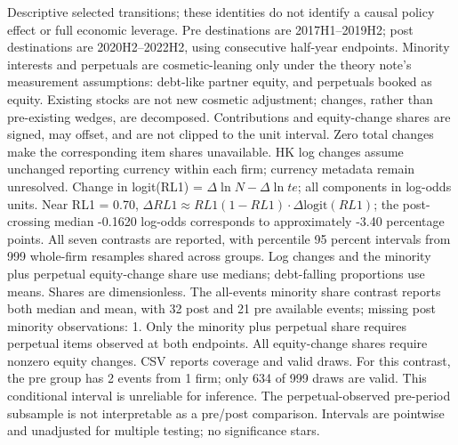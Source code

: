 \begin{table}[!htbp]
\begin{threeparttable}
\begin{tablenotes}[flushleft]
\item[] Descriptive selected transitions; these identities do not identify a causal policy effect or full economic leverage. Pre destinations are 2017H1--2019H2; post destinations are 2020H2--2022H2, using consecutive half-year endpoints. Minority interests and perpetuals are cosmetic-leaning only under the theory note's measurement assumptions: debt-like partner equity, and perpetuals booked as equity. Existing stocks are not new cosmetic adjustment; changes, rather than pre-existing wedges, are decomposed. Contributions and equity-change shares are signed, may offset, and are not clipped to the unit interval. Zero total changes make the corresponding item shares unavailable. HK log changes assume unchanged reporting currency within each firm; currency metadata remain unresolved. Change in logit(RL1) = $\Delta\ln N - \Delta\ln te$; all components in log-odds units. Near RL1 = 0.70, $\Delta RL1 \approx RL1(1-RL1)\cdot\Delta\mathrm{logit}(RL1)$; the post-crossing median -0.1620 log-odds corresponds to approximately -3.40 percentage points. All seven contrasts are reported, with percentile 95 percent intervals from 999 whole-firm resamples shared across groups. Log changes and the minority plus perpetual equity-change share use medians; debt-falling proportions use means. Shares are dimensionless. The all-events minority share contrast reports both median and mean, with 32 post and 21 pre available events; missing post minority observations: 1. Only the minority plus perpetual share requires perpetual items observed at both endpoints. All equity-change shares require nonzero equity changes. CSV reports coverage and valid draws. For this contrast, the pre group has 2 events from 1 firm; only 634 of 999 draws are valid. This conditional interval is unreliable for inference. The perpetual-observed pre-period subsample is not interpretable as a pre/post comparison. Intervals are pointwise and unadjusted for multiple testing; no significance stars.
\end{tablenotes}
\end{threeparttable}
\end{table}
